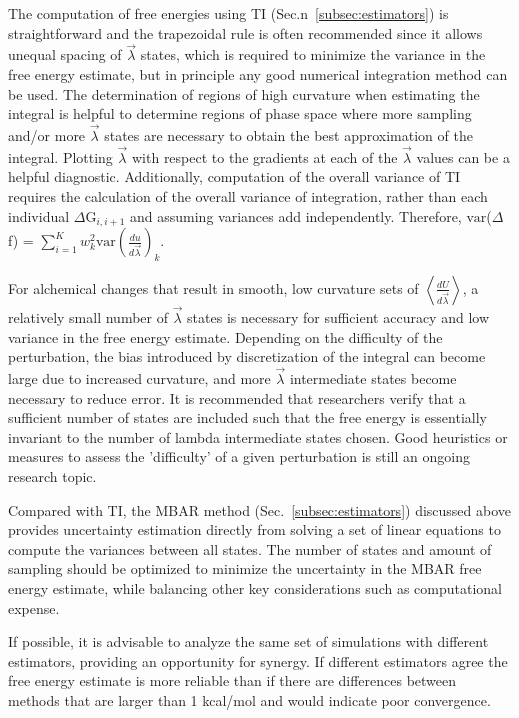 \documentclass[9pt,bestpractices,pubversion]{livecoms}
\newcommand{\expect}[1]{\left\langle{#1}\right\rangle}
\begin{document}
The computation of free energies using TI (Sec.n~\ref{subsec:estimators}) is straightforward and the trapezoidal rule is often recommended since it allows unequal spacing of $\vec{\lambda}$ states, which is required to minimize the variance in the free energy estimate, but in principle any good numerical integration method can be used. 
The determination of regions of high curvature when estimating the integral is helpful to determine regions of phase space where more sampling and/or more $\vec{\lambda}$ states are necessary to obtain the best approximation of the integral. Plotting $\vec{\lambda}$ with respect to the gradients at each of the $\vec{\lambda}$ values can be a helpful diagnostic. 
Additionally, computation of the overall variance of TI requires the calculation of the overall variance of integration, rather than each individual $\Delta$G$_{i,i+1}$ and assuming variances add independently. 
Therefore, $\mathrm{var}$($\Delta$f) = $\sum_{i=1}^{K}w_{k}^2 \mathrm{var}(\frac{du}{d\vec{\lambda}})_{k}$.

For alchemical changes that result in smooth, low curvature sets of $\expect{\frac{dU}{d\vec{\lambda}}}$, a relatively small number of $\vec{\lambda}$ states is necessary for sufficient accuracy and low variance in the free energy estimate. 
Depending on the difficulty of the perturbation, the bias introduced by discretization of the integral can become large due to increased curvature, and more $\vec{\lambda}$ intermediate states become necessary to reduce error.
It is recommended that researchers verify that a sufficient number of states are included such that the free energy is essentially invariant to the number of lambda intermediate states chosen. Good heuristics or measures to assess the 'difficulty' of a given perturbation is still an ongoing research topic. 

Compared with TI, the MBAR method (Sec.~\ref{subsec:estimators}) discussed above provides uncertainty estimation directly from solving a set of linear equations to compute the variances between all states. 
The number of states and amount of sampling should be optimized to minimize the uncertainty in the MBAR free energy estimate, while balancing other key considerations such as computational expense. 

If possible, it is advisable to analyze the same set of simulations with different estimators, providing an opportunity for synergy. If different estimators agree the free energy estimate is more reliable than if there are differences between methods that are larger than 1 kcal/mol and would indicate poor convergence. 
\end{document}
